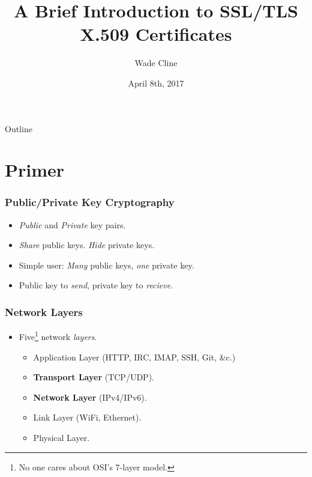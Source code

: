 \documentclass[xcolor={dvipsnames,svgnames},hyperref=dvips]{beamer}
\title[X.509 Introduction]{A Brief Introduction to SSL/TLS X.509 Certificates}
\author{Wade Cline}
\date{April 8th, 2017}
\begin{document}
\begin{frame}
  \titlepage
\end{frame}

\begin{frame}{Outline}
  \tableofcontents
\end{frame}

\section{Primer}
	\begin{frame}
		\frametitle{Public/Private Key Cryptography}
		\begin{itemize}
		\item \textit{Public} and \textit{Private} key pairs.
		\item \textit{Share} public keys.  \textit{Hide} private keys.
		\item Simple user: \textit{Many} public keys, \textit{one} private key.
		\item Public key to \textit{send}, private key to \textit{recieve}.
		\end{itemize}
	\end{frame}

	\begin{frame}
		\frametitle{Network Layers}
		\begin{itemize}
		\item Five\footnote{No one cares about OSI's 7-layer model.} network \textit{layers}.
			\begin{itemize}
			\item Application Layer (HTTP, IRC, IMAP, SSH, Git, \&c.)
			\item \textbf{Transport Layer} (TCP/UDP).
			\item \textbf{Network Layer} (IPv4/IPv6).
			\item Link Layer (WiFi, Ethernet).
			\item Physical Layer.
			\end{itemize}
		\end{itemize}
	\end{frame}
\end{document}

